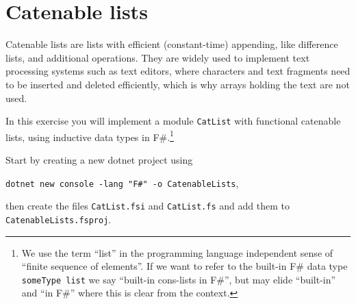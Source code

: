 \section*{Catenable lists}

Catenable lists are lists with efficient (constant-time) appending, like difference lists, and additional operations.  They are widely used to implement text processing systems such as text editors, where characters and text fragments need to be inserted and deleted efficiently, which is why arrays holding the text are not used.

In this exercise you will implement a module \texttt{CatList} with functional catenable lists, using inductive data types in F\#.\footnote{We use the term ``list'' in the programming language independent sense of ``finite sequence of elements''.  If we want to refer to the built-in F\# data type \texttt{someType list} we say ``built-in cons-lists in F\#'', but may elide ``built-in'' and ``in F\#'' where this is clear from the context.}


Start by creating a new dotnet project using 
\begin{center}
\texttt{dotnet new console -lang "F\#" -o CatenableLists},
\end{center} 
then create the files \texttt{CatList.fsi} and \texttt{CatList.fs}
and add them to \texttt{CatenableLists.fsproj}.


